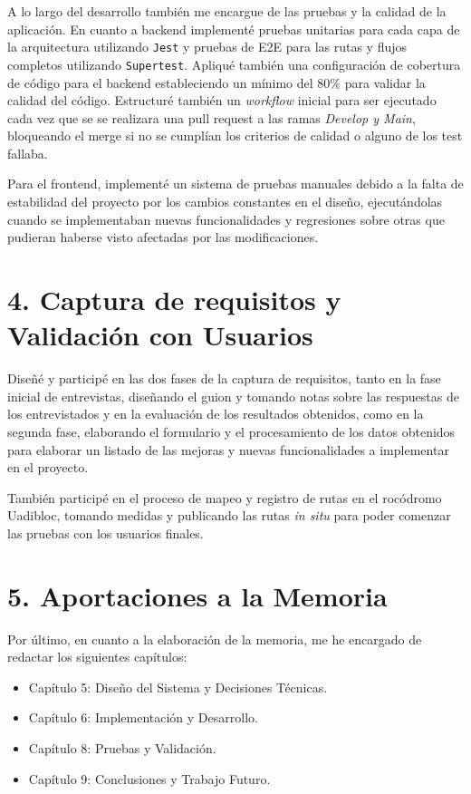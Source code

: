 A lo largo del desarrollo también me encargue de las pruebas y la calidad de la aplicación. En cuanto a backend implementé pruebas unitarias para cada capa de la arquitectura utilizando \texttt{Jest} y pruebas de E2E para las rutas y flujos completos utilizando \texttt{Supertest}. Apliqué también una configuración de cobertura de código para el backend estableciendo un mínimo del 80\% para validar la calidad del código. Estructuré también un \textit{workflow} inicial para ser ejecutado cada vez que se se realizara una pull request a las ramas \textit{Develop y Main}, bloqueando el merge si no se cumplían los criterios de calidad o alguno de los test fallaba.

Para el frontend, implementé un sistema de pruebas manuales debido a la falta de estabilidad del proyecto por los cambios constantes en el diseño, ejecutándolas cuando se implementaban nuevas funcionalidades y regresiones sobre otras que pudieran haberse visto afectadas por las modificaciones. 

\section*{4. Captura de requisitos y Validación con Usuarios}

Diseñé y participé en las dos fases de la captura de requisitos, tanto en la fase inicial de entrevistas, diseñando el guion y tomando notas sobre las respuestas de los entrevistados y en la evaluación de los resultados obtenidos, como en la segunda fase, elaborando el formulario y el procesamiento de los datos obtenidos para elaborar un listado de las mejoras y nuevas funcionalidades a implementar en el proyecto. 

También participé en el proceso de mapeo y registro de rutas en el rocódromo Uadibloc, tomando medidas y publicando las rutas \textit{in situ} para poder comenzar las pruebas con los usuarios finales.

\section*{5. Aportaciones a la Memoria}
Por último, en cuanto a la elaboración de la memoria, me he encargado de redactar los siguientes capítulos:
\begin{itemize}
    \item Capítulo 5: Diseño del Sistema y Decisiones Técnicas.
    \item Capítulo 6: Implementación y Desarrollo.
    \item Capítulo 8: Pruebas y Validación.
    \item Capítulo 9: Conclusiones y Trabajo Futuro.
\end{itemize}

